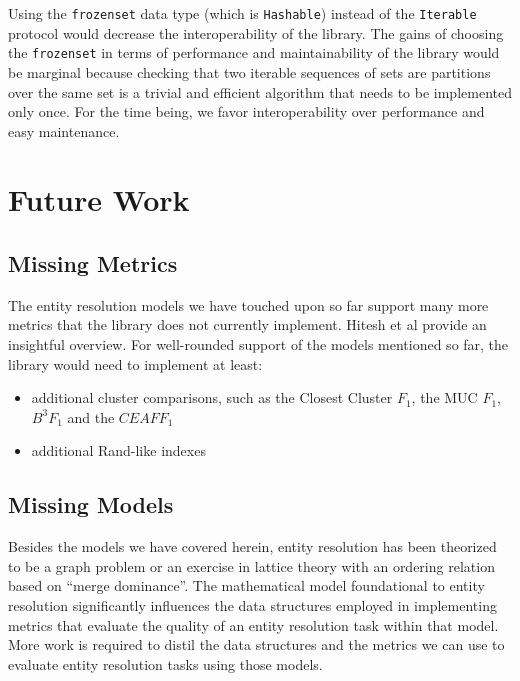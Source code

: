 \documentclass[11pt]{article}
\begin{document}
    Using the \texttt{frozenset} data type (which is \texttt{Hashable}) instead
    of the \texttt{Iterable} protocol would decrease the interoperability of the
    library.
    The gains of choosing the \texttt{frozenset} in terms of performance and
    maintainability of the library would be marginal because checking that two
    iterable sequences of sets are partitions over the same set is a trivial and
    efficient algorithm that needs to be implemented only once.
    For the time being, we favor interoperability over performance and easy
    maintenance.

    \section{Future Work}\label{sec:future}

    \subsection{Missing Metrics}

    The entity resolution models we have touched upon so far support many more
    metrics that the library does not currently implement.
    Hitesh et al provide an insightful overview\cite{hitesh2012}.
    For well-rounded support of the models mentioned so far, the library would
    need to implement at least:
    \begin{itemize}
        \item additional cluster comparisons, such as the Closest Cluster $F_1$, the
        MUC $F_1$, $B^3 F_1$ and the $CEAF F_1$\cite{hitesh2012}
        \item additional Rand-like indexes\cite{warrens2022understanding}
    \end{itemize}

    \subsection{Missing Models}

    Besides the models we have covered herein, entity resolution has been
    theorized to be a graph problem\cite{eager2021} or an exercise in lattice
    theory with an ordering relation based on
    ``merge dominance''\cite{Ben2009Swoosh}.
    The mathematical model foundational to entity resolution significantly
    influences the data structures employed in implementing metrics that
    evaluate the quality of an entity resolution task within that model.
    More work is required to distil the data structures and the metrics we can
    use to evaluate entity resolution tasks using those models.
\end{document}
